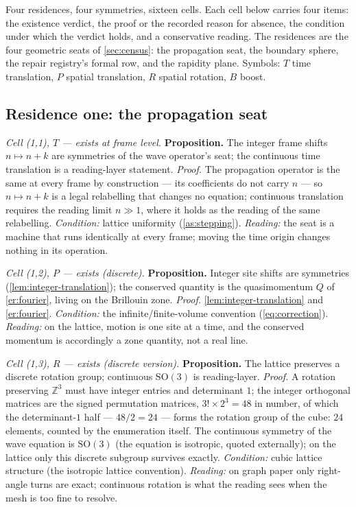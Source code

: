 \documentclass[11pt]{amsbook}
\theoremstyle{plain}
\theoremstyle{definition}
\theoremstyle{remark}
\begin{document}
Four residences, four symmetries, sixteen cells. Each cell below carries four items: the existence verdict, the proof or the recorded reason for absence, the condition under which the verdict holds, and a conservative reading. The residences are the four geometric seats of \cref{sec:census}: the propagation seat, the boundary sphere, the repair registry's formal row, and the rapidity plane. Symbols: $T$ time translation, $P$ spatial translation, $R$ spatial rotation, $B$ boost.

\subsection{Residence one: the propagation seat}\label{sec:grid-propagation}

\emph{Cell (1,1), $T$ --- exists at frame level.} \textbf{Proposition.} The integer frame shifts $n \mapsto n+k$ are symmetries of the wave operator's seat; the continuous time translation is a reading-layer statement. \emph{Proof.} The propagation operator is the same at every frame by construction --- its coefficients do not carry $n$ --- so $n \mapsto n+k$ is a legal relabelling that changes no equation; continuous translation requires the reading limit $n \gg 1$, where it holds as the reading of the same relabelling. \emph{Condition:} lattice uniformity (\cref{as:stepping}). \emph{Reading:} the seat is a machine that runs identically at every frame; moving the time origin changes nothing in its operation.

\emph{Cell (1,2), $P$ --- exists (discrete).} \textbf{Proposition.} Integer site shifts are symmetries (\cref{lem:integer-translation}); the conserved quantity is the quasimomentum $Q$ of \cref{er:fourier}, living on the Brillouin zone. \emph{Proof.} \cref{lem:integer-translation} and \cref{er:fourier}. \emph{Condition:} the infinite/finite-volume convention (\cref{eq:correction}). \emph{Reading:} on the lattice, motion is one site at a time, and the conserved momentum is accordingly a zone quantity, not a real line.

\emph{Cell (1,3), $R$ --- exists (discrete version).} \textbf{Proposition.} The lattice preserves a discrete rotation group; continuous $\mathrm{SO}(3)$ is reading-layer. \emph{Proof.} A rotation preserving $\mathbb{Z}^{3}$ must have integer entries and determinant $1$; the integer orthogonal matrices are the signed permutation matrices, $3! \times 2^{3} = 48$ in number, of which the determinant-$1$ half --- $48/2 = 24$ --- forms the rotation group of the cube: $24$ elements, counted by the enumeration itself. The continuous symmetry of the wave equation is $\mathrm{SO}(3)$ (the equation is isotropic, quoted externally); on the lattice only this discrete subgroup survives exactly. \emph{Condition:} cubic lattice structure (the isotropic lattice convention). \emph{Reading:} on graph paper only right-angle turns are exact; continuous rotation is what the reading sees when the mesh is too fine to resolve.
\end{document}
